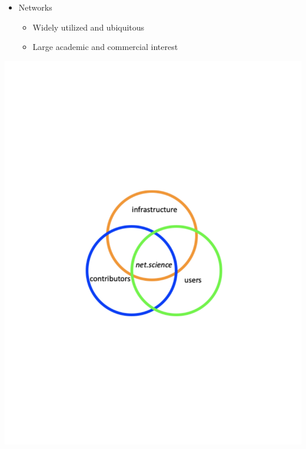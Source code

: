 \documentclass[landscape,paperwidth=70in,paperheight=46in,fontscale=0.225]{baposter} %
\begin{document}
\begin{poster}
{\begin{minipage}{.73\textwidth}
\begin{itemize}[leftmargin=*,noitemsep,topsep=0pt]
\item Networks
	\begin{itemize}
	\item Widely utilized and ubiquitous
	\item Large academic and commercial interest
	\end{itemize}
\end{itemize}
 \end{minipage}       
\begin{minipage}{.22\textwidth}
\includegraphics[scale=0.23]{figures/motivation.pdf}
\end{minipage}

}
\end{poster}
\end{document}
